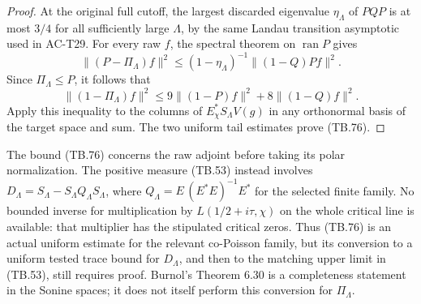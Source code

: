 \begin{proof}
At the original full cutoff, the largest discarded
eigenvalue \(\eta_\Lambda\) of \(PQP\) is at most \(3/4\)
for all sufficiently large \(\Lambda\), by the same
Landau transition asymptotic used in AC-T29.
For every raw \(f\), the spectral theorem on
\(\operatorname{ran}P\) gives
\[
 \|(P-\Pi_\Lambda)f\|^2
   \leq(1-\eta_\Lambda)^{-1}\|(1-Q)Pf\|^2.
 \]
Since \(\Pi_\Lambda\leq P\), it follows that
\[
 \|(1-\Pi_\Lambda)f\|^2
      \leq9\|(1-P)f\|^2+8\|(1-Q)f\|^2.
 \tag{TB.82}
\]
Apply this inequality to the columns of
\(E_\chi^*S_\Lambda V(g)\) in any orthonormal basis of
the target space and sum.
The two uniform tail estimates prove (TB.76).
\end{proof}

\begin{remark}
The bound (TB.76) concerns the raw adjoint before taking its
polar normalization.
The positive measure (TB.53) instead involves
\(D_\Lambda=S_\Lambda-S_\Lambda Q_\Lambda S_\Lambda\),
where \(Q_\Lambda=E\,(E^*E)^{-1}E^*\) for the selected
finite family.
No bounded inverse for multiplication by
\(L(1/2+i\tau,\chi)\) on the whole critical line is available:
that multiplier has the stipulated critical zeros.
Thus (TB.76) is an actual uniform estimate for the relevant
co-Poisson family, but its conversion to a uniform tested
trace bound for \(D_\Lambda\), and then to the matching
upper limit in (TB.53), still requires proof.
Burnol's Theorem 6.30 is a completeness statement in the
Sonine spaces; it does not itself perform this conversion
for \(\Pi_\Lambda\).
\end{remark}

